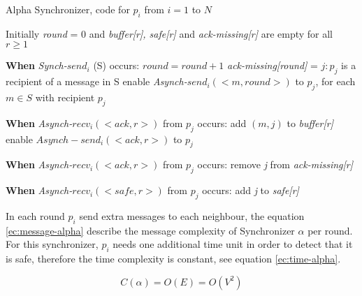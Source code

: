 \begin{algorithm}
 \caption{Alpha Synchronizer, code for $p_i$ from $i = 1$ to $N$}
 \label{algorithm:alpha} 

\SetAlgoNoLine

Initially \textit{round} = 0 and \newline
\textit{buffer[r], safe[r]} and \textit{ack-missing[r]} are empty for all $r \geq 1$ \newline

\textbf{When} \textit{Synch-}$send_i$ (S) occurs:\newline
$round = round + 1$ \newline
\textit{ack-missing[round]} = {$j:p_j$ is a recipient of a message in S} \newline
enable \textit{Asynch-}$send_i(<m,round>)$  to $p_j$, for each $m \in S$ with recipient $p_j$ \newline

\textbf{When} \textit{Asynch-}$recv_i(<ack,r>)$ from $p_j$ occurs: \newline
add $(m,j)$ to \textit{buffer[r]} \newline
enable $Asynch-send_i(<ack,r>)$ to $p_j$ \newline

\textbf{When} \textit{Asynch-}$recv_i(<ack,r>)$ from $p_j$ occurs: \newline
remove \textit{j} from \textit{ack-missing[r]} \newline
{}

\textbf{When} \textit{Asynch-}$recv_i(<safe,r>)$ from $p_j$ occurs: \newline
add \textit{j} to \textit{safe[r]} \newline
{}

\end{algorithm}


In each round $p_i$ send extra messages to each neighbour, the equation \ref{ec:message-alpha} describe the message complexity of Synchronizer $\alpha$ per round.  For this synchronizer, $p_i$ needs one additional time unit in order to detect that it is safe, therefore the time complexity is constant, see equation \ref{ec:time-alpha}.  


\begin{equation}
\label{ec:message-alpha}
 C(\alpha) = O(E) = O(V^2) 
\end{equation}

